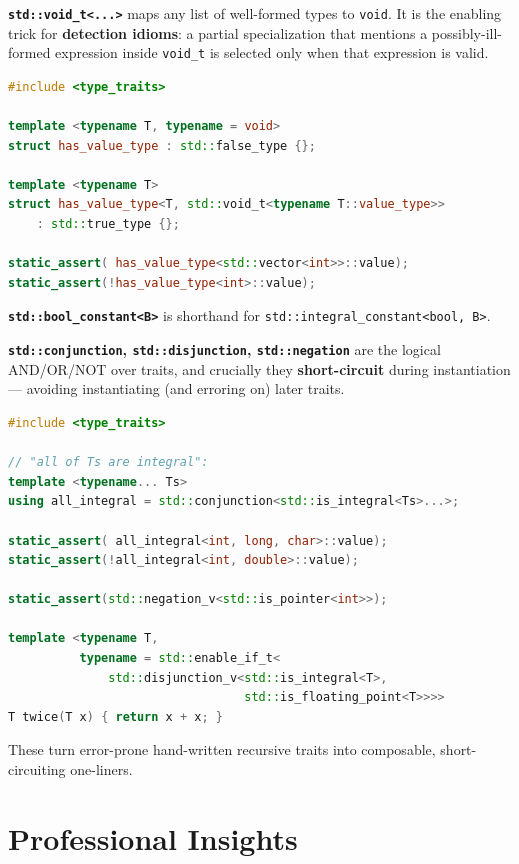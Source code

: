 \textbf{\texttt{std::void\_t<...>}} maps any list of well-formed types to \texttt{void}. It is the enabling trick for \textbf{detection idioms}: a partial specialization that mentions a possibly-ill-formed expression inside \texttt{void\_t} is selected only when that expression is valid.

\begin{lstlisting}[language=C++,caption={void\_t detection idiom --- does T have a ::value\_type?}]
#include <type_traits>

template <typename T, typename = void>
struct has_value_type : std::false_type {};

template <typename T>
struct has_value_type<T, std::void_t<typename T::value_type>>
    : std::true_type {};

static_assert( has_value_type<std::vector<int>>::value);
static_assert(!has_value_type<int>::value);
\end{lstlisting}

\textbf{\texttt{std::bool\_constant<B>}} is shorthand for \texttt{std::integral\_constant<bool, B>}.

\textbf{\texttt{std::conjunction}, \texttt{std::disjunction}, \texttt{std::negation}} are the logical AND/OR/NOT over traits, and crucially they \textbf{short-circuit} during instantiation --- avoiding instantiating (and erroring on) later traits.

\begin{lstlisting}[language=C++,caption={Composing traits with short-circuiting combinators}]
#include <type_traits>

// "all of Ts are integral":
template <typename... Ts>
using all_integral = std::conjunction<std::is_integral<Ts>...>;

static_assert( all_integral<int, long, char>::value);
static_assert(!all_integral<int, double>::value);

static_assert(std::negation_v<std::is_pointer<int>>);

template <typename T,
          typename = std::enable_if_t<
              std::disjunction_v<std::is_integral<T>,
                                 std::is_floating_point<T>>>>
T twice(T x) { return x + x; }
\end{lstlisting}

These turn error-prone hand-written recursive traits into composable, short-circuiting one-liners.

\section{Professional Insights}
\label{sec:c17-templates-insights}

